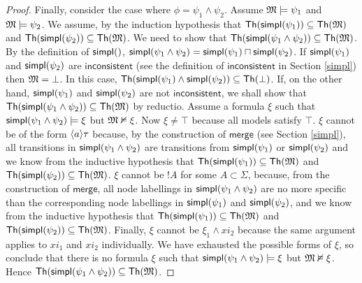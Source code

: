 \begin{proof}
Finally, consider the case where $\phi = \psi_1 \land \psi_2$.
Assume $\frak{M} \models \psi_1$ and $\frak{M} \models \psi_2$.
We assume, by the induction hypothesis that $\mathsf{Th}(\mathsf{simpl}(\psi_1)) \subseteq \mathsf{Th}(\frak{M})$ and $\mathsf{Th}(\mathsf{simpl}(\psi_2)) \subseteq \mathsf{Th}(\frak{M})$.
We need to show that $\mathsf{Th}(\mathsf{simpl}(\psi_1\land \psi_2)) \subseteq \mathsf{Th}(\frak{M})$.
By the definition of $\mathsf{simpl}()$, $\mathsf{simpl}(\psi_1 \land \psi_2) = \mathsf{simpl}(\psi_1) \sqcap \mathsf{simpl}(\psi_2)$.
If $\mathsf{simpl}(\psi_1)$ and $\mathsf{simpl}(\psi_2)$ are $\mathsf{inconsistent}$ (see the definition of $\mathsf{inconsistent}$ in Section \ref{simpl}) then $\frak{M} = \bot$. In this case, $\mathsf{Th}(\mathsf{simpl}(\psi_1) \land \mathsf{simpl}(\psi_2)) \subseteq \mathsf{Th}(\bot)$.
If, on the other hand, $\mathsf{simpl}(\psi_1)$ and $\mathsf{simpl}(\psi_2)$ are not $\mathsf{inconsistent}$, we shall show that $\mathsf{Th}(\mathsf{simpl}(\psi_1 \land \psi_2)) \subseteq \mathsf{Th}(\frak{M})$ by reductio.
Assume a formula $\xi$ such that $\mathsf{simpl}(\psi_1 \land \psi_2) \models \xi$ but $\frak{M} \nvDash \xi$.
Now $\xi \neq \top$ because all models satisfy $\top$.
$\xi$ cannot be of the form $\langle a \rangle \tau$ because, by the construction of $\mathsf{merge}$ (see Section \ref{simpl}), all transitions in $\mathsf{simpl}(\psi_1 \land \psi_2)$ are transitions from $\mathsf{simpl}(\psi_1)$ or $\mathsf{simpl}(\psi_2)$ and we know from the inductive hypothesis that $\mathsf{Th}(\mathsf{simpl}(\psi_1)) \subseteq \mathsf{Th}(\frak{M})$ and $\mathsf{Th}(\mathsf{simpl}(\psi_2)) \subseteq \mathsf{Th}(\frak{M})$.
$\xi$ cannot be $!A$ for some $A \subset \Sigma$, because, from the construction of $\mathsf{merge}$, all node labellings in $\mathsf{simpl}(\psi_1 \land \psi_2)$ are no more specific than the corresponding node labellings in $\mathsf{simpl}(\psi_1)$ and $\mathsf{simpl}(\psi_2)$, and we know from the inductive hypothesis that $\mathsf{Th}(\mathsf{simpl}(\psi_1)) \subseteq \mathsf{Th}(\frak{M})$ and $\mathsf{Th}(\mathsf{simpl}(\psi_2)) \subseteq \mathsf{Th}(\frak{M})$.
Finally, $\xi$ cannot be $\xi_1 \land xi_2$ because the same argument applies to $xi_1$ and $xi_2$ individually.
We have exhausted the possible forms of $\xi$, so conclude that there is no formula $\xi$ such that $\mathsf{simpl}(\psi_1 \land \psi_2) \models \xi$ but $\frak{M} \nvDash \xi$.
Hence $\mathsf{Th}(\mathsf{simpl}(\psi_1\land \psi_2)) \subseteq \mathsf{Th}(\frak{M})$.
\end{proof}
